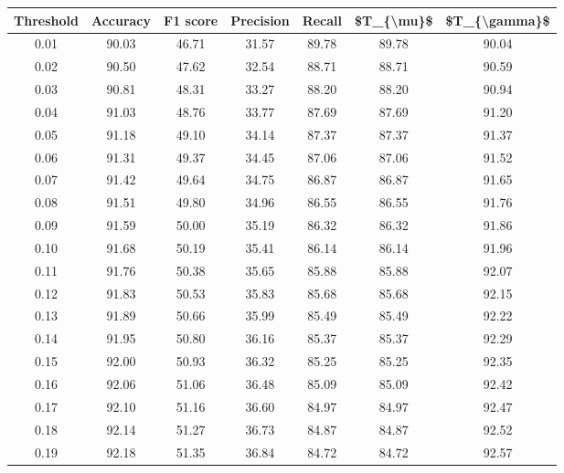 \begin{tabular}{|c|c|c|c|c|c|c|}
\hline
 Threshold &  Accuracy &  F1 score &  Precision &  Recall &  \$T\_\{\textbackslash mu\}\$ &  \$T\_\{\textbackslash gamma\}\$ \\
\hline
      0.01 &     90.03 &     46.71 &      31.57 &   89.78 &      89.78 &         90.04 \\
      0.02 &     90.50 &     47.62 &      32.54 &   88.71 &      88.71 &         90.59 \\
      0.03 &     90.81 &     48.31 &      33.27 &   88.20 &      88.20 &         90.94 \\
      0.04 &     91.03 &     48.76 &      33.77 &   87.69 &      87.69 &         91.20 \\
      0.05 &     91.18 &     49.10 &      34.14 &   87.37 &      87.37 &         91.37 \\
      0.06 &     91.31 &     49.37 &      34.45 &   87.06 &      87.06 &         91.52 \\
      0.07 &     91.42 &     49.64 &      34.75 &   86.87 &      86.87 &         91.65 \\
      0.08 &     91.51 &     49.80 &      34.96 &   86.55 &      86.55 &         91.76 \\
      0.09 &     91.59 &     50.00 &      35.19 &   86.32 &      86.32 &         91.86 \\
      0.10 &     91.68 &     50.19 &      35.41 &   86.14 &      86.14 &         91.96 \\
      0.11 &     91.76 &     50.38 &      35.65 &   85.88 &      85.88 &         92.07 \\
      0.12 &     91.83 &     50.53 &      35.83 &   85.68 &      85.68 &         92.15 \\
      0.13 &     91.89 &     50.66 &      35.99 &   85.49 &      85.49 &         92.22 \\
      0.14 &     91.95 &     50.80 &      36.16 &   85.37 &      85.37 &         92.29 \\
      0.15 &     92.00 &     50.93 &      36.32 &   85.25 &      85.25 &         92.35 \\
      0.16 &     92.06 &     51.06 &      36.48 &   85.09 &      85.09 &         92.42 \\
      0.17 &     92.10 &     51.16 &      36.60 &   84.97 &      84.97 &         92.47 \\
      0.18 &     92.14 &     51.27 &      36.73 &   84.87 &      84.87 &         92.52 \\
      0.19 &     92.18 &     51.35 &      36.84 &   84.72 &      84.72 &         92.57 \\

\end{tabular}
